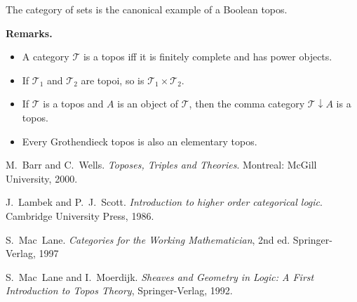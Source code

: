 \documentclass[12pt]{article}
\begin{document}
The category of sets is the canonical example of a Boolean topos.

\textbf{Remarks.}  
\begin{itemize}
\item
A category $\mathcal{T}$ is a topos iff it is finitely complete and has power objects.
\item
If $\mathcal{T}_1$ and $\mathcal{T}_2$ are topoi, so is $\mathcal{T}_1\times \mathcal{T}_2$.
\item
If $\mathcal{T}$ is a topos and $A$ is an object of $\mathcal{T}$, then the comma category $\mathcal{T}\downarrow A$ is a topos.
\item
Every Grothendieck topos is also an elementary topos.
\end{itemize}

\begin{thebibliography}{99}
M.~Barr and C.~Wells. {\it Toposes, Triples and Theories}. Montreal: McGill University, 2000.

J.~Lambek and P.~J.~Scott. {\it Introduction to higher order categorical logic}.  Cambridge University Press, 1986.

S.~Mac~Lane. {\it Categories for the Working Mathematician}, 2nd ed.  Springer-Verlag, 1997

S.~Mac~Lane and I.~Moerdijk. {\it Sheaves and Geometry in Logic: A First Introduction to Topos Theory}, Springer-Verlag, 1992.
\end{thebibliography}
\end{document}
